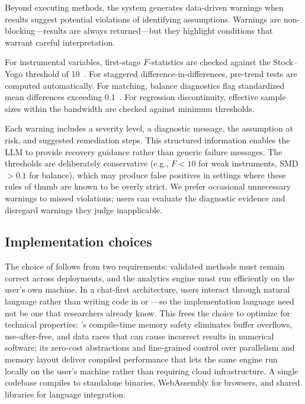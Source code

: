 Beyond executing methods, the system generates data-driven warnings
when results suggest potential violations of identifying assumptions.
Warnings are non-blocking---results are always returned---but they highlight
conditions that warrant careful interpretation.

For instrumental variables, first-stage $F$-statistics are checked
against the Stock--Yogo threshold of 10~\citep{Stock+Yogo:2005}. For
staggered difference-in-differences, pre-trend tests are computed
automatically. For matching, balance diagnostics flag
standardized mean differences exceeding 0.1~\citep{Austin:2011}. For
regression discontinuity, effective sample sizes within the bandwidth
are checked against minimum thresholds.

Each warning includes a severity level, a diagnostic message,
the assumption at risk, and suggested remediation steps. This
structured information enables the LLM to provide recovery guidance
rather than generic failure messages. The thresholds are
deliberately conservative (e.g., $F < 10$ for weak instruments,
SMD $> 0.1$ for balance), which may produce false positives in
settings where these rules of thumb are known to be overly
strict. We prefer occasional unnecessary warnings to missed
violations; users can evaluate the diagnostic evidence and
disregard warnings they judge inapplicable.

\subsection{Implementation choices}

The choice of  follows from two requirements:
validated methods must remain correct across deployments, and the
analytics engine must run efficiently on the user's own machine.
In a chat-first architecture, users interact through natural language
rather than writing code in  or ---so the
implementation language need not be one that researchers already know.
This frees the choice to optimize for technical properties:
's compile-time memory safety eliminates buffer
overflows, use-after-free, and data races that can cause incorrect
results in numerical software; its zero-cost abstractions and
fine-grained control over parallelism and memory layout deliver
compiled performance that lets the same engine run locally on the
user's machine rather than requiring cloud infrastructure.
A single codebase compiles to standalone binaries, WebAssembly for
browsers, and shared libraries for language integration.

